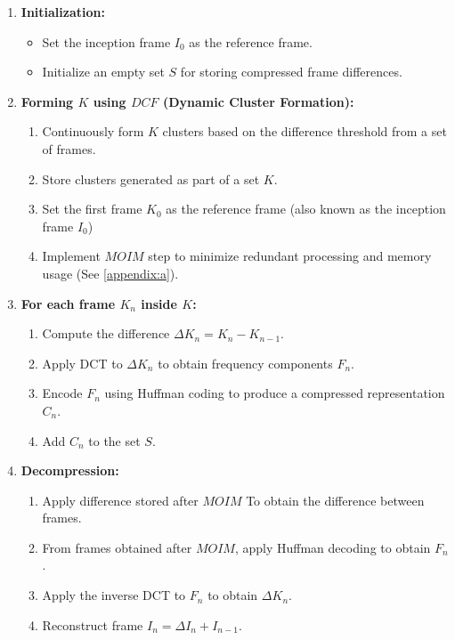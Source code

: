 \documentclass[twocolumn]{article}
\begin{document}
\begin{enumerate}
    \item \textbf{Initialization:}
    \begin{itemize}
        \item Set the inception frame $I_0$ as the reference frame.
        \item Initialize an empty set $S$ for storing compressed frame differences.
    \end{itemize}

    \item \textbf{Forming $K$ using $DCF$ (Dynamic Cluster Formation):}
    \begin{enumerate}
        \item Continuously form $K$ clusters based on the difference threshold from a set of frames.
        \item Store clusters generated as part of a set $K$.
        \item Set the first frame $K_0$ as the reference frame (also known as the inception frame $I_0$)
        \item Implement $MOIM$ step to minimize redundant processing and memory usage (See \ref{appendix:a}).
    \end{enumerate}

    \item \textbf{For each frame $K_n$ inside $K$:}
    \begin{enumerate}
        \item Compute the difference $\Delta K_{n} = K_{n} - K_{n-1}$.
        \item Apply DCT to $\Delta K_{n}$ to obtain frequency components $F_{n}$.
        \item Encode $F_{n}$ using Huffman coding to produce a compressed representation $C_{n}$.
        \item Add $C_{n}$ to the set $S$.
    \end{enumerate}

    \item \textbf{Decompression:}
    \begin{enumerate}
        \item Apply difference stored after $MOIM$ To obtain the difference between frames.
        \item From frames obtained after $MOIM$, apply Huffman decoding to obtain $F_{n}$.
        \item Apply the inverse DCT to $F_{n}$ to obtain $\Delta K_{n}$.
        \item Reconstruct frame $I_n = \Delta I_{n} + I_{n-1}$.
    \end{enumerate}
\end{enumerate}
\end{document}
